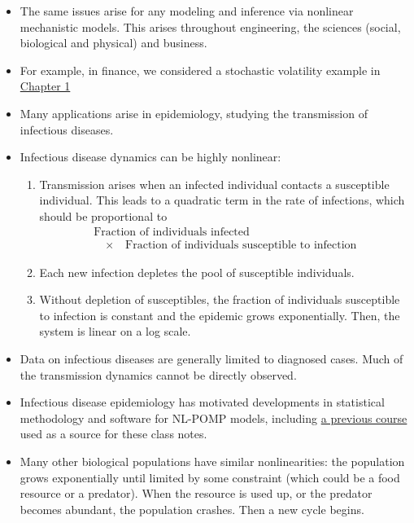 \documentclass[]{article}
\begin{document}
\begin{itemize}
\item
  The same issues arise for any modeling and inference via nonlinear
  mechanistic models. This arises throughout engineering, the sciences
  (social, biological and physical) and business.
\item
  For example, in finance, we considered a stochastic volatility example
  in
  \href{http://ionides.github.io/531w16/notes01/intro.html\#models-dynamic-systems-state-space-models}{Chapter
  1}
\item
  Many applications arise in epidemiology, studying the transmission of
  infectious diseases.
\item
  Infectious disease dynamics can be highly nonlinear:

  \begin{enumerate}
  \def\labelenumi{\arabic{enumi}.}
  \item
    Transmission arises when an infected individual contacts a
    susceptible individual. This leads to a quadratic term in the rate
    of infections, which should be proportional to \[\begin{array}{ll}
    \mbox{Fraction of individuals infected}\\
    \quad\times\quad \mbox{Fraction of individuals susceptible to infection}
    \end{array}\]
  \item
    Each new infection depletes the pool of susceptible individuals.
  \item
    Without depletion of susceptibles, the fraction of individuals
    susceptible to infection is constant and the epidemic grows
    exponentially. Then, the system is linear on a log scale.
  \end{enumerate}
\item
  Data on infectious diseases are generally limited to diagnosed cases.
  Much of the transmission dynamics cannot be directly observed.
\item
  Infectious disease epidemiology has motivated developments in
  statistical methodology and software for NL-POMP models, including
  \href{http://kingaa.github.io/sbied/}{a previous course} used as a
  source for these class notes.
\item
  Many other biological populations have similar nonlinearities: the
  population grows exponentially until limited by some constraint (which
  could be a food resource or a predator). When the resource is used up,
  or the predator becomes abundant, the population crashes. Then a new
  cycle begins.
\end{itemize}
\end{document}
